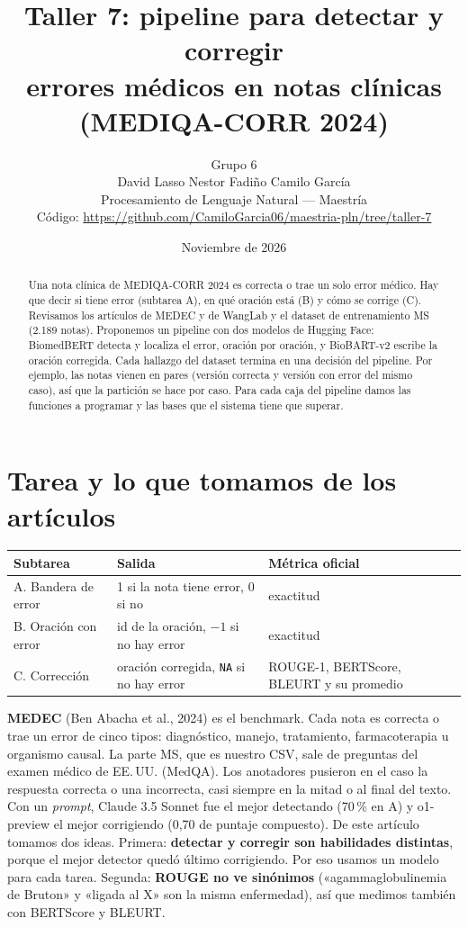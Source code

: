 \documentclass[11pt,a4paper]{article}
\title{\textbf{Taller 7: pipeline para detectar y corregir\\errores médicos en notas clínicas (MEDIQA-CORR 2024)}}
\author{Grupo 6 \\ David Lasso \quad Nestor Fadiño \quad Camilo García \\[0.3em]
  \small Procesamiento de Lenguaje Natural --- Maestría \\
  \small Código: \url{https://github.com/CamiloGarcia06/maestria-pln/tree/taller-7}}
\date{Noviembre de 2026}
\begin{document}
\maketitle
\vspace{-1.5em}

\begin{abstract}
\noindent
Una nota clínica de MEDIQA-CORR 2024 es correcta o trae un solo error médico. Hay que decir si tiene error
(subtarea A), en qué oración está (B) y cómo se corrige (C). Revisamos los artículos de MEDEC y de WangLab y el
dataset de entrenamiento MS (2.189 notas). Proponemos un pipeline con dos modelos de Hugging Face: BiomedBERT
detecta y localiza el error, oración por oración, y BioBART-v2 escribe la oración corregida. Cada hallazgo del
dataset termina en una decisión del pipeline. Por ejemplo, las notas vienen en pares (versión correcta y versión
con error del mismo caso), así que la partición se hace por caso. Para cada caja del pipeline damos las funciones
a programar y las bases que el sistema tiene que superar.
\end{abstract}

\section{Tarea y lo que tomamos de los artículos}

\begin{table}[H]
\centering\small
\begin{tabularx}{\textwidth}{llL}
\toprule
Subtarea & Salida & Métrica oficial \\
\midrule
A. Bandera de error  & 1 si la nota tiene error, 0 si no & exactitud \\
B. Oración con error & id de la oración, $-1$ si no hay error & exactitud \\
C. Corrección        & oración corregida, \texttt{NA} si no hay error & ROUGE-1, BERTScore, BLEURT y su promedio \\
\bottomrule
\end{tabularx}
\end{table}

\textbf{MEDEC} (Ben Abacha et al., 2024) es el benchmark. Cada nota es correcta o trae un error de cinco tipos:
diagnóstico, manejo, tratamiento, farmacoterapia u organismo causal. La parte MS, que es nuestro CSV, sale de
preguntas del examen médico de EE.\,UU. (MedQA). Los anotadores pusieron en el caso la respuesta correcta o una
incorrecta, casi siempre en la mitad o al final del texto. Con un \emph{prompt}, Claude 3.5 Sonnet fue el mejor
detectando (70\,\% en A) y o1-preview el mejor corrigiendo (0,70 de puntaje compuesto). De este artículo tomamos
dos ideas. Primera: \textbf{detectar y corregir son habilidades distintas}, porque el mejor detector quedó último
corrigiendo. Por eso usamos un modelo para cada tarea. Segunda: \textbf{ROUGE no ve sinónimos}
(«agammaglobulinemia de Bruton» y «ligada al X» son la misma enfermedad), así que medimos también con BERTScore
y BLEURT.
\end{document}
